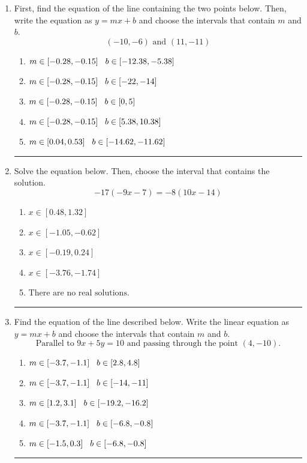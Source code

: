 \documentclass[14pt]{extbook}
\newcommand{\litem}[1]{\item#1\hspace*{-1cm}\rule{\textwidth}{0.4pt}}
\begin{document}
\begin{enumerate}
{\begin{enumerate}[label=\Alph*.]
\end{enumerate} }
\litem{
First, find the equation of the line containing the two points below. Then, write the equation as $ y=mx+b $ and choose the intervals that contain $m$ and $b$.\[ (-10, -6) \text{ and } (11, -11) \]\begin{enumerate}[label=\Alph*.]
\item \( m \in [-0.28, -0.15] \hspace*{3mm} b \in [-12.38, -5.38] \)
\item \( m \in [-0.28, -0.15] \hspace*{3mm} b \in [-22, -14] \)
\item \( m \in [-0.28, -0.15] \hspace*{3mm} b \in [0, 5] \)
\item \( m \in [-0.28, -0.15] \hspace*{3mm} b \in [5.38, 10.38] \)
\item \( m \in [0.04, 0.53] \hspace*{3mm} b \in [-14.62, -11.62] \)

\end{enumerate} }
\litem{
Solve the equation below. Then, choose the interval that contains the solution.\[ -17(-9x -7) = -8(10x -14) \]\begin{enumerate}[label=\Alph*.]
\item \( x \in [0.48, 1.32] \)
\item \( x \in [-1.05, -0.62] \)
\item \( x \in [-0.19, 0.24] \)
\item \( x \in [-3.76, -1.74] \)
\item \( \text{There are no real solutions.} \)

\end{enumerate} }
\litem{
Find the equation of the line described below. Write the linear equation as $ y=mx+b $ and choose the intervals that contain $m$ and $b$.\[ \text{Parallel to } 9 x + 5 y = 10 \text{ and passing through the point } (4, -10). \]\begin{enumerate}[label=\Alph*.]
\item \( m \in [-3.7, -1.1] \hspace*{3mm} b \in [2.8, 4.8] \)
\item \( m \in [-3.7, -1.1] \hspace*{3mm} b \in [-14, -11] \)
\item \( m \in [1.2, 3.1] \hspace*{3mm} b \in [-19.2, -16.2] \)
\item \( m \in [-3.7, -1.1] \hspace*{3mm} b \in [-6.8, -0.8] \)
\item \( m \in [-1.5, 0.3] \hspace*{3mm} b \in [-6.8, -0.8] \)


\end{enumerate}}
\end{enumerate}
\end{document}
